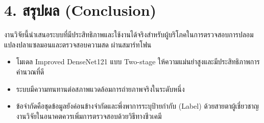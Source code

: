 \documentclass[a4paper,12pt]{article}
\begin{document}
\section{4. สรุปผล (Conclusion)}
งานวิจัยนี้นำเสนอระบบที่มีประสิทธิภาพและใช้งานได้จริงสำหรับผู้บริโภคในการตรวจสอบการปลอมแปลงปลาแซลมอนและตรวจสอบความสด ผ่านสมาร์ทโฟน
\begin{itemize}
    \item โมเดล Improved DenseNet121 แบบ Two-stage ให้ความแม่นยำสูงและมีประสิทธิภาพการคำนวณที่ดี
    \item ระบบมีความทนทานต่อสภาพแวดล้อมการถ่ายภาพจริงในระดับหนึ่ง
    \item ข้อจำกัดคือชุดข้อมูลยังค่อนข้างจำกัดและพึ่งพาการระบุป้ายกำกับ (Label) ด้วยสายตาผู้เชี่ยวชาญ งานวิจัยในอนาคตควรเพิ่มการตรวจสอบด้วยวิธีทางชีวเคมี
\end{itemize}
\end{document}
